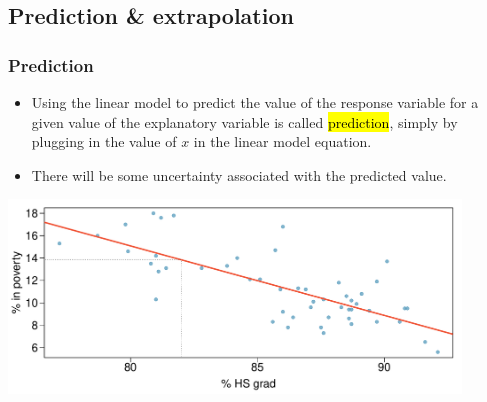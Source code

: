 
\subsection{Prediction \& extrapolation}



\begin{frame}
\frametitle{Prediction}

\begin{itemize}

\item Using the linear model to predict the value of the response variable for a given value of the explanatory variable is called \hl{prediction}, simply by plugging in the value of $x$ in the linear model equation.

\item There will be some uncertainty associated with the predicted value.

\end{itemize}

\begin{center}
\includegraphics[width=0.9\textwidth]{8-2_least_square_reg/figures/poverty/poverty_hsgrad_pred}
\end{center}

\end{frame}


